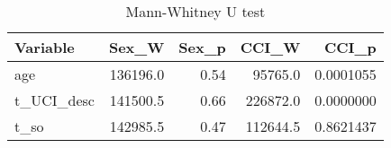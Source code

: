 \begin{table}

\caption{Mann-Whitney U test}
\centering
\begin{tabular}[t]{l|r|r|r|r}
\hline
Variable & Sex\_W & Sex\_p & CCI\_W & CCI\_p\\
\hline
age & 136196.0 & 0.54 & 95765.0 & 0.0001055\\
\hline
t\_UCI\_desc & 141500.5 & 0.66 & 226872.0 & 0.0000000\\
\hline
t\_so & 142985.5 & 0.47 & 112644.5 & 0.8621437\\
\hline
\end{tabular}
\end{table}
